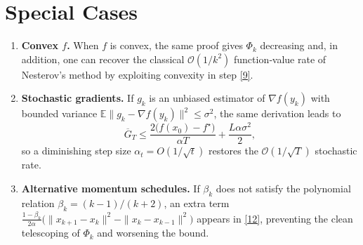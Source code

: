 \documentclass{article}
\begin{document}
\section*{Special Cases}
\begin{enumerate}[leftmargin=*]
\item \textbf{Convex \(f\).} When \(f\) is convex, the same proof gives
\(\Phi_k\) decreasing and, in addition, one can recover the classical
\(\mathcal{O}(1/k^{2})\) function‑value rate of Nesterov’s method by
exploiting convexity in step \eqref{9}.
\item \textbf{Stochastic gradients.} If \(g_k\) is an unbiased estimator of
\(\nabla f(y_k)\) with bounded variance \(\mathbb{E}\|g_k-\nabla f(y_k)\|^{2}\le\sigma^{2}\),
the same derivation leads to
\[
\overline{G}_T \le \frac{2\bigl(f(x_0)-f^\star\bigr)}{\alpha T}
               +\frac{L\alpha\sigma^{2}}{2},
\]
so a diminishing step size \(\alpha_t=O(1/\sqrt{t})\) restores the
\(\mathcal{O}(1/\sqrt{T})\) stochastic rate.
\item \textbf{Alternative momentum schedules.}
If \(\beta_k\) does not satisfy the polynomial relation
\(\beta_k=(k-1)/(k+2)\), an extra term
\(\frac{1-\beta_k}{2\alpha}\bigl(\|x_{k+1}-x_k\|^{2}
               -\|x_k-x_{k-1}\|^{2}\bigr)\) appears in \eqref{12},
preventing the clean telescoping of \(\Phi_k\) and worsening the bound.
\end{enumerate}
\end{document}
